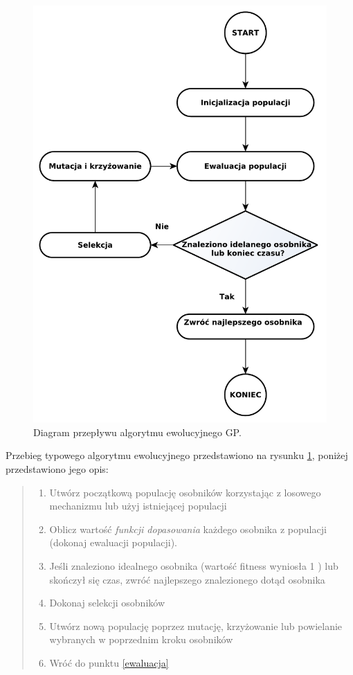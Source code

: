 \begin{figure}[h]
\centering
\includegraphics[scale=0.5]{figures/graphs/ea}
\caption{Diagram przepływu algorytmu ewolucyjnego GP.\label{fig:ea}}
\end{figure}

Przebieg typowego algorytmu ewolucyjnego przedstawiono na rysunku \ref{fig:ea}, poniżej przedstawiono jego opis:
\begin{quote}
	\begin{enumerate}
	\item Utwórz początkową populację osobników korzystając z losowego mechanizmu lub użyj istniejącej populacji
	\item \label{ewaluacja} Oblicz wartość \textit{funkcji dopasowania} każdego osobnika z populacji (dokonaj ewaluacji populacji).
	\item Jeśli znaleziono idealnego osobnika (wartość fitness wyniosła 1 ) lub skończył się czas, zwróć najlepszego znalezionego dotąd osobnika
	\item Dokonaj selekcji osobników
	\item Utwórz nową populację poprzez mutację, krzyżowanie lub powielanie wybranych w poprzednim kroku osobników
	\item Wróć do punktu \ref{ewaluacja}
	\end{enumerate}
\end{quote}



